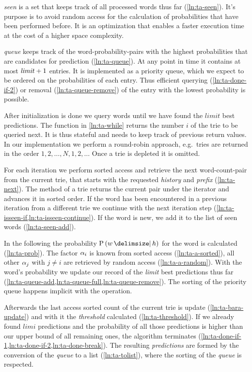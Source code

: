 \emph{seen} is a set that keeps track of all processed words thus far
(\cref{ln:ta-seen}).
It's purpose is to avoid random access for the calculation of probabilities
that have been performed before.
It is an optimization that enables a faster execution time at the cost of
a higher space complexity.

\emph{queue} keeps track of the word-probability-pairs with the highest
probabilities that are candidates for prediction (\cref{ln:ta-queue}).
At any point in time it contains at most $\text{\emph{limit}} + 1$ entries.
It is implemented as a priority queue, which we expect to be ordered on
the probabilities of each entry.
Thus efficient querying (\cref{ln:ta-done-if-2}) or removal
(\cref{ln:ta-queue-remove}) of the entry with the lowest probability is
possible.

After initialization is done we query words until we have found the $limit$
best predictions.
The  function in \cref{ln:ta-while} returns the number $i$
of the trie to be queried next.
It is thus stateful and needs to keep track of previous return values.
In our implementation we perform a round-robin approach, e.g.\ tries are
returned in the order $1, 2, \ldots, N, 1, 2, \ldots$
Once a trie is depleted it is omitted.

For each iteration we perform sorted access and retrieve the next
word-count-pair from the current trie, that starts with the requested
\emph{history} and \emph{prefix} (\cref{ln:ta-next}).
The  method of a trie returns the current pair under
the iterator and advances it in sorted order.
If the word has been encountered in a previous iteration from a different trie
we continue with the next iteration step
(\cref{ln:ta-isseen-if,ln:ta-isseen-continue}).
If the word is new, we add it to the list of seen words (\cref{ln:ta-seen-add}).

In the following the probability $\Prob{w}{h}$ for the word is calculated
(\cref{ln:ta-prob}).
The factor $\alpha_i$ is known from sorted access (\cref{ln:ta-a-sorted}), all
other $\alpha_j$ with $j \neq i$ are retrieved by random access
(\cref{ln:ta-a-random}).
With the word's probability we update our record of the \emph{limit} best
predictions thus far
(\cref{ln:ta-queue-add,ln:ta-queue-full,ln:ta-queue-remove}).
The sorting of the priority queue happens implicit with the
 operation.

Afterwards the last access sorted count of the current trie is update
(\cref{ln:ta-bara-update}) and with it the \emph{threshold} calculated
(\cref{ln:ta-threshold}).
If we already found $limi$ predictions and the probability of all those
predictions is higher than our upper bound of all remaining ones, the algorithm
terminates (\cref{ln:ta-done-if-1,ln:ta-done-if-2,ln:ta-done-break}).
The resulting \emph{predictions} are formed by the conversion of the
\emph{queue} to a list (\cref{ln:ta-tolist}), where the sorting of the
\emph{queue} is respected.

